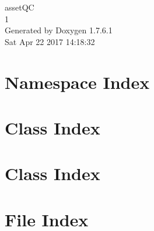 \documentclass[a4paper]{book}
\begin{document}
\hypersetup{pageanchor=false,citecolor=blue}
\begin{titlepage}
\vspace*{7cm}
\begin{center}
{\Large asset\-Q\-C \\[1ex]\large 1 }\\
\vspace*{1cm}
{\large \-Generated by Doxygen 1.7.6.1}\\
\vspace*{0.5cm}
{\small Sat Apr 22 2017 14:18:32}\\
\end{center}
\end{titlepage}
\clearemptydoublepage
{}
\tableofcontents
\clearemptydoublepage
{}
\hypersetup{pageanchor=true,citecolor=blue}
\chapter{\-Namespace \-Index}

\chapter{\-Class \-Index}

\chapter{\-Class \-Index}

\chapter{\-File \-Index}

\end{document}
